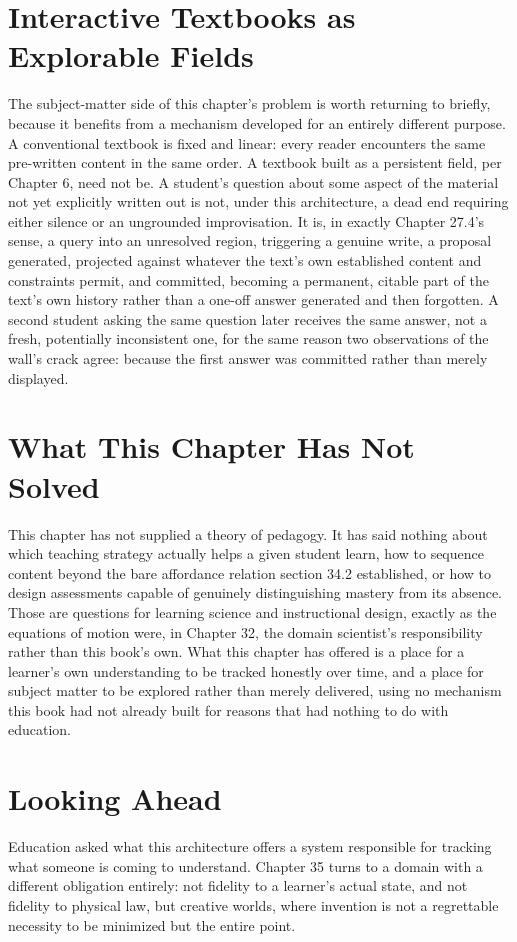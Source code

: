 \section{Interactive Textbooks as Explorable Fields}

The subject-matter side of this chapter's problem is worth returning to briefly, because it benefits from a mechanism developed for an entirely different purpose. A conventional textbook is fixed and linear: every reader encounters the same pre-written content in the same order. A textbook built as a persistent field, per Chapter 6, need not be. A student's question about some aspect of the material not yet explicitly written out is not, under this architecture, a dead end requiring either silence or an ungrounded improvisation. It is, in exactly Chapter 27.4's sense, a query into an unresolved region, triggering a genuine write, a proposal generated, projected against whatever the text's own established content and constraints permit, and committed, becoming a permanent, citable part of the text's own history rather than a one-off answer generated and then forgotten. A second student asking the same question later receives the same answer, not a fresh, potentially inconsistent one, for the same reason two observations of the wall's crack agree: because the first answer was committed rather than merely displayed.

\section{What This Chapter Has Not Solved}

This chapter has not supplied a theory of pedagogy. It has said nothing about which teaching strategy actually helps a given student learn, how to sequence content beyond the bare affordance relation section 34.2 established, or how to design assessments capable of genuinely distinguishing mastery from its absence. Those are questions for learning science and instructional design, exactly as the equations of motion were, in Chapter 32, the domain scientist's responsibility rather than this book's own. What this chapter has offered is a place for a learner's own understanding to be tracked honestly over time, and a place for subject matter to be explored rather than merely delivered, using no mechanism this book had not already built for reasons that had nothing to do with education.

\section{Looking Ahead}

Education asked what this architecture offers a system responsible for tracking what someone is coming to understand. Chapter 35 turns to a domain with a different obligation entirely: not fidelity to a learner's actual state, and not fidelity to physical law, but creative worlds, where invention is not a regrettable necessity to be minimized but the entire point.
